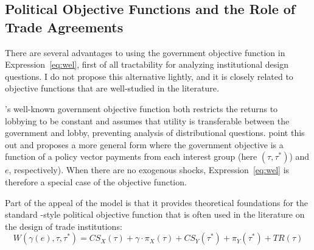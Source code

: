 \documentclass[12pt,titlepage]{article}
\newtheorem{assumption}{Assumption}
\newcommand{\ve}{\theta}
\newcommand{\ga}{\gamma}
\begin{document}





\subsection{Political Objective Functions and the Role of Trade Agreements}
\label{sec:objfcn}
There are several advantages to using the government objective function in Expression~\ref{eq:wel}, first of all tractability for analyzing institutional design questions. I do not propose this alternative lightly, and it is closely related to objective functions that are well-studied in the literature.

\Textcite{gh94}'s well-known government objective function both restricts the returns to lobbying to be constant and assumes that utility is transferable between the government and lobby, preventing analysis of distributional questions. \Textcite{dgh97} point this out and proposes a more general form where the government objective is a function of a policy vector payments from each interest group (here $\left(\tau,\tau^*\right)$) and $e$, respectively). When there are no exogenous shocks, Expression~\ref{eq:wel} is therefore a special case of the \Textcite{dgh97} objective function.

Part of the appeal of the \Textcite{gh94} model is that it provides theoretical foundations for the standard \Textcite{baldwin}-style political objective function that is often used in the literature on the design of trade institutions:
\begin{equation}
  W(\ga(e),\tau,\tau^*) = \mathit{CS}_X(\tau) + \ga \cdot \pi_X(\tau) + \mathit{CS}_Y(\tau^*) + \pi_Y(\tau^*) + \mathit{TR}(\tau)
  \label{eq:baldwin}
\end{equation}
\end{document}
